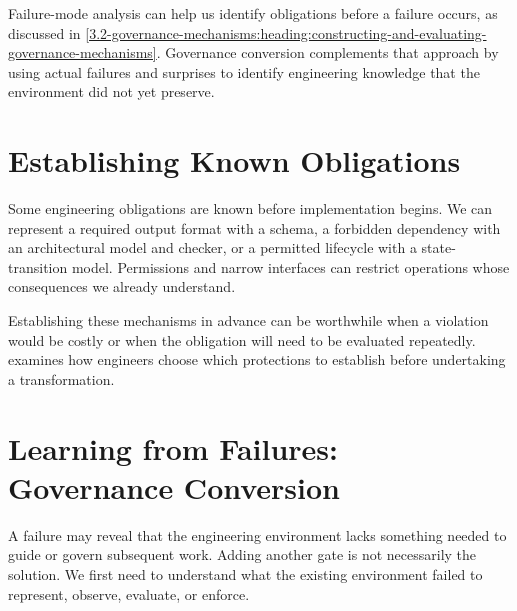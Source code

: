 Failure-mode analysis can help us identify obligations before a failure occurs, as discussed in \autoref{3.2-governance-mechanisms:heading:constructing-and-evaluating-governance-mechanisms}. Governance conversion complements that approach by using actual failures and surprises to identify engineering knowledge that the environment did not yet preserve.

\section{Establishing Known Obligations}\label{heading:up-front-encode-what-you-already-know}




Some engineering obligations are known before implementation begins. We can represent a required output format with a schema, a forbidden dependency with an architectural model and checker, or a permitted lifecycle with a state-transition model. Permissions and narrow interfaces can restrict operations whose consequences we already understand.

Establishing these mechanisms in advance can be worthwhile when a violation would be costly or when the obligation will need to be evaluated repeatedly.  examines how engineers choose which protections to establish before undertaking a transformation.

\section{Learning from Failures: Governance Conversion}\label{heading:as-you-learn-convert-what-the-work-teaches}



A failure may reveal that the engineering environment lacks something needed to guide or govern subsequent work. Adding another gate is not necessarily the solution. We first need to understand what the existing environment failed to represent, observe, evaluate, or enforce.

